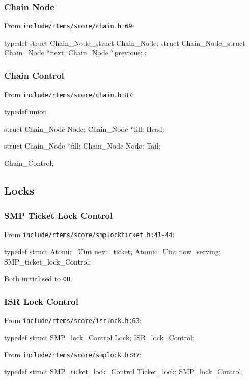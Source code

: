 \subsubsection{Chain Node}

From \texttt{include/rtems/score/chain.h:69}:
\begin{nicec}
typedef struct Chain_Node_struct Chain_Node;
struct Chain_Node_struct {
  Chain_Node *next;
  Chain_Node *previous;
};
\end{nicec}

\subsubsection{Chain Control}

From \texttt{include/rtems/score/chain.h:87}:
\begin{nicec}
typedef union {
  struct {
    Chain_Node Node;
    Chain_Node *fill;
  } Head;

  struct {
    Chain_Node *fill;
    Chain_Node Node;
  } Tail;
} Chain_Control;
\end{nicec}

\newpage
\subsection{Locks}

\subsubsection{SMP Ticket Lock Control}

From \texttt{include/rtems/score/smplockticket.h:41-44}:
\begin{nicec}
typedef struct {
  Atomic_Uint next_ticket;
  Atomic_Uint now_serving;
} SMP_ticket_lock_Control;
\end{nicec}
Both initialised to \texttt{0U}.


\subsubsection{ISR Lock Control}

From \texttt{include/rtems/score/isrlock.h:63}:
\begin{nicec}
typedef struct {
  SMP_lock_Control Lock;
} ISR_lock_Control;
\end{nicec}
From \texttt{include/rtems/score/smplock.h:87}:
\begin{nicec}
typedef struct {
  SMP_ticket_lock_Control Ticket_lock;
} SMP_lock_Control;
\end{nicec}

